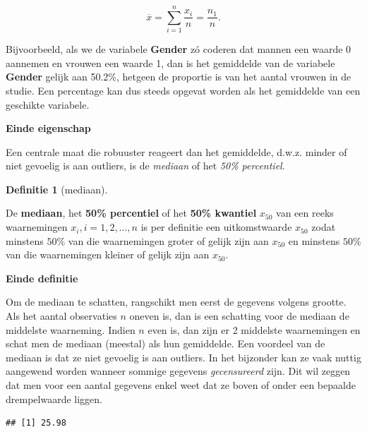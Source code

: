 \documentclass[
  12pt,dutch]{book}
\newenvironment{Shaded}{\begin{snugshade}}{\end{snugshade}}
\newcommand{\AttributeTok}[1]{\textcolor[rgb]{0.13,0.29,0.53}{#1}}
\newcommand{\ConstantTok}[1]{\textcolor[rgb]{0.56,0.35,0.01}{#1}}
\newcommand{\FunctionTok}[1]{\textcolor[rgb]{0.13,0.29,0.53}{\textbf{#1}}}
\newcommand{\NormalTok}[1]{#1}
\newcommand{\SpecialCharTok}[1]{\textcolor[rgb]{0.81,0.36,0.00}{\textbf{#1}}}
\theoremstyle{definition}
\newtheorem{definition}{Definitie}[chapter]
\theoremstyle{definition}
\theoremstyle{definition}
\theoremstyle{definition}
\theoremstyle{remark}
\begin{document}
\begin{equation*}
\overline{x}= \sum_{i=1}^n \frac{x_i}{n} = \frac{n_1}{n}.
\end{equation*}

Bijvoorbeeld, als we de variabele \textbf{Gender} zó
coderen dat mannen een waarde 0 aannemen en vrouwen een waarde 1, dan is het
gemiddelde van de variabele \textbf{Gender} gelijk aan 50.2\%, hetgeen de proportie is van het aantal vrouwen in de studie. Een percentage kan dus
steeds opgevat worden als het gemiddelde van een geschikte variabele.

\textbf{Einde eigenschap}

Een centrale maat die robuuster reageert dan het gemiddelde, d.w.z. minder
of niet gevoelig is aan outliers, is de \emph{mediaan} of het \emph{50\% percentiel}.

\begin{definition}[mediaan]
\protect\hypertarget{def:unnamed-chunk-95}{}\label{def:unnamed-chunk-95}~
\end{definition}

De \textbf{mediaan}, het \textbf{50\% percentiel} of het \textbf{50\%
kwantiel} \(x_{50}\) van een reeks waarnemingen \(x_i, i=1, 2, \dots, n\) is per
definitie een uitkomstwaarde \(x_{50}\) zodat minstens \(50\%\) van die
waarnemingen groter of gelijk zijn aan \(x_{50}\) en minstens \(50\%\) van die
waarnemingen kleiner of gelijk zijn aan \(x_{50}\).

\textbf{Einde definitie}

Om de mediaan te schatten, rangschikt men eerst de gegevens volgens grootte.
Als het aantal observaties \(n\) oneven is, dan is een schatting voor de
mediaan de middelste waarneming. Indien \(n\) even is, dan zijn er 2 middelste
waarnemingen en schat men de mediaan (meestal) als hun gemiddelde. Een
voordeel van de mediaan is dat ze niet gevoelig is aan outliers. In het bijzonder kan
ze vaak nuttig aangewend worden wanneer sommige gegevens \emph{gecensureerd}
zijn. Dit wil zeggen dat men voor een aantal gegevens enkel weet dat ze
boven of onder een bepaalde drempelwaarde liggen.

\begin{Shaded}
\end{Shaded}

\begin{verbatim}
## [1] 25.98
\end{verbatim}
\end{document}
